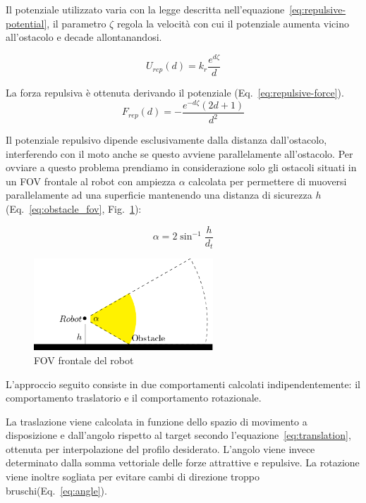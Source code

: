 \documentclass[a4paper]{article}
\begin{document}
	Il potenziale utilizzato varia con la legge descritta
	nell'equazione~\ref{eq:repulsive-potential}, il parametro $ \zeta $ regola
	la velocità con cui il potenziale aumenta vicino all'ostacolo e decade
	allontanandosi.

	\begin{equation}\label{eq:repulsive-potential}
		U_{rep}(d) = k_r \frac{e^{d\zeta}}{d}
	\end{equation}

	La forza repulsiva è ottenuta derivando il potenziale (Eq.~\ref{eq:repulsive-force}).
	\begin{equation}\label{eq:repulsive-force}
		F_{rep}(d)=- \frac	{e^{-d\zeta}(2d+1)} {d^{2}} 
	\end{equation}

	Il potenziale repulsivo dipende esclusivamente dalla distanza
	dall'ostacolo, interferendo con il moto anche se questo avviene
	parallelamente all'ostacolo. Per ovviare a questo problema prendiamo in
	considerazione solo gli ostacoli situati in un FOV frontale al robot con
	ampiezza $ \alpha  $ calcolata per permettere di muoversi parallelamente ad
	una superficie mantenendo una distanza di sicurezza $ h $
	(Eq.~\ref{eq:obstacle_fov}, Fig.~\ref{fig:obstacle_fov}): 

	\begin{equation}\label{eq:obstacle_fov}
		\alpha = {2}\sin^{-1}{\frac{h}{d_t}}
	\end{equation}

	\begin{figure}[H]
		\centering
		\includegraphics[width=0.6\textwidth]{./img/obstacle_fov.pdf}
		\caption{FOV frontale del robot}
		\label{fig:obstacle_fov}
	\end{figure}

	L'approccio seguito consiste in due comportamenti calcolati
	indipendentemente: il comportamento traslatorio e il comportamento
	rotazionale.

	La traslazione viene calcolata in funzione dello spazio di movimento a
	disposizione e dall'angolo rispetto al target secondo
	l'equazione~\ref{eq:translation}, ottenuta per interpolazione del profilo
	desiderato. L'angolo viene invece determinato dalla somma vettoriale delle
	forze attrattive e repulsive. La rotazione viene inoltre sogliata per
	evitare cambi di direzione troppo bruschi(Eq.~\ref{eq:angle}).
\end{document}
